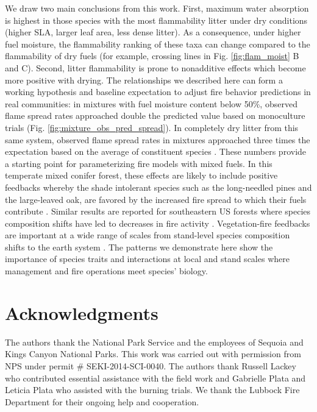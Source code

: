 \documentclass[letterpaper,12pt]{article}
\begin{document}
We draw two main conclusions from this work. First, maximum water absorption is
highest in those species with the most flammability litter under dry conditions
(higher SLA, larger leaf area, less dense litter). As a consequence, under
higher fuel moisture, the flammability ranking of these taxa can change
compared to the flammability of dry fuels (for example, crossing lines in Fig.
\ref{fig:flam_moist} B and C). Second, litter flammability is prone to
nonadditive effects which become more positive with drying. The relationships
we described here can form a working hypothesis and baseline expectation to
adjust fire behavior predictions in real communities: in mixtures with fuel
moisture content below 50\%, observed flame spread rates approached double the
predicted value based on monoculture trials (Fig.
\ref{fig:mixture_obs_pred_spread}). In completely dry litter from this same
system, observed flame spread rates in mixtures approached three times the
expectation based on the average of constituent species
\citep{Magalhaes+Schwilk-2012}. These numbers provide a starting point for
parameterizing fire models with mixed fuels. In this temperate mixed conifer
forest, these effects are likely to include positive feedbacks whereby the
shade intolerant species such as the long-needled pines and the large-leaved
oak, are favored by the increased fire spread to which their fuels contribute
\citep{Schwilk+Caprio-2011}. Similar results are reported for southeastern US
forests where species composition shifts have led to decreases in fire activity
\citep{Nowacki+Abrams-2008}. Vegetation-fire feedbacks are important at a wide
range of scales from stand-level species composition shifts to the earth system
\citep{Harris+Remenyi+etal-2016, Archibald+Lehmann+etal-2018}. The patterns we
demonstrate here show the importance of species traits and interactions at
local and stand scales where management and fire operations meet species'
biology.



\section*{Acknowledgments}

The authors thank the National Park Service and the employees of Sequoia and
Kings Canyon National Parks. This work was carried out with permission from NPS
under permit \# SEKI-2014-SCI-0040. The authors thank Russell Lackey who
contributed essential assistance with the field work and Gabrielle Plata and
Leticia Plata who assisted with the burning trials. We thank the Lubbock Fire
Department for their ongoing help and cooperation.
\end{document}
